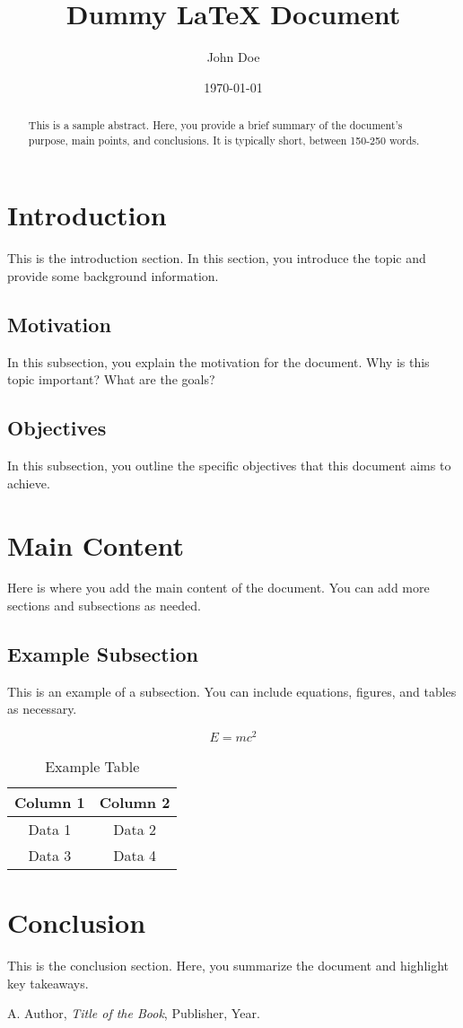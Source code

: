 \documentclass{article}
\title{Dummy LaTeX Document}
\author{John Doe}
\date{\today}
\begin{document}
\maketitle

\begin{abstract}
This is a sample abstract. Here, you provide a brief summary of the document's purpose, main points, and conclusions. It is typically short, between 150-250 words.
\end{abstract}

\section{Introduction}
This is the introduction section. In this section, you introduce the topic and provide some background information.

\subsection{Motivation}
In this subsection, you explain the motivation for the document. Why is this topic important? What are the goals?

\subsection{Objectives}
In this subsection, you outline the specific objectives that this document aims to achieve.

\section{Main Content}
Here is where you add the main content of the document. You can add more sections and subsections as needed.

\subsection{Example Subsection}
This is an example of a subsection. You can include equations, figures, and tables as necessary.

\begin{equation}
E = mc^2
\end{equation}

\begin{table}[h!]
    \centering
    \begin{tabular}{|c|c|}
        \hline
        Column 1 & Column 2 \\
        \hline
        Data 1 & Data 2 \\
        Data 3 & Data 4 \\
        \hline
    \end{tabular}
    \caption{Example Table}
    \label{tab:example}
\end{table}

\section{Conclusion}
This is the conclusion section. Here, you summarize the document and highlight key takeaways.

\begin{thebibliography}{9}
     A. Author, \textit{Title of the Book}, Publisher, Year.
\end{thebibliography}
\end{document}
